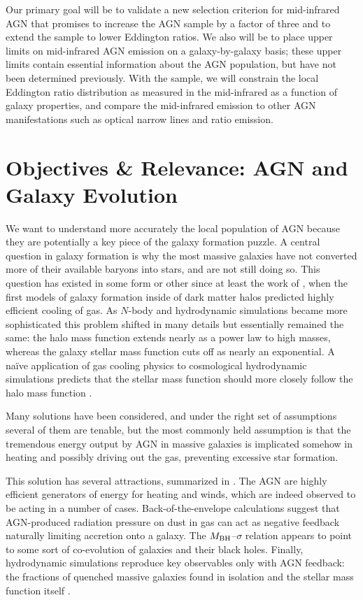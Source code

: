 \documentclass[12pt, preprint]{hacked-aastex}
\begin{document}
Our primary goal will be to validate a new selection criterion 
for mid-infrared AGN that promises to increase the AGN sample by 
a factor of three and to extend the sample to lower Eddington ratios.
We also will be to place upper limits on mid-infrared AGN emission
on a galaxy-by-galaxy basis; these upper limits contain
essential information about the AGN population, but have not 
been determined previously.
With the sample, we will constrain the local Eddington ratio 
distribution as measured in the mid-infrared as a function of 
galaxy properties, and compare the mid-infrared emission to other 
AGN manifestations such as optical narrow lines and ratio emission. 

\section{Objectives \& Relevance: AGN and Galaxy Evolution}\label{sec:intro}

We want to understand more accurately the local population of AGN because
they are potentially a key piece of the galaxy formation puzzle.
A central question in galaxy formation is why the most massive
galaxies have not converted more of their available baryons into stars,
and are not still doing so. This question has existed in some form or 
other since at least the work of \cite{white78a}, when the first models 
of galaxy formation
inside of dark matter halos predicted highly efficient cooling of
gas. As $N$-body and hydrodynamic simulations became more sophisticated 
this problem shifted in many details but essentially remained the same: 
the halo mass function extends nearly as a power law to high masses, whereas 
the galaxy stellar mass function cuts off as nearly an exponential. 
A na\"ive application of gas cooling physics to cosmological hydrodynamic
simulations predicts that the stellar mass function should more closely follow the halo mass function \cite{benson03a, somerville15a}.

Many solutions have been considered, and under the right set of assumptions
several of them are tenable, but the most commonly held assumption is that
the tremendous energy output by AGN in massive galaxies is implicated somehow
in heating and possibly driving out the gas, preventing excessive star formation.

This solution has several attractions, summarized in \cite{fabian12}. The AGN 
are highly efficient generators
of energy for heating and winds, which are indeed observed to be acting in a 
number of cases. Back-of-the-envelope calculations suggest that 
AGN-produced
radiation pressure on dust in gas can act as negative feedback naturally limiting
accretion onto a galaxy. The $M_{\rm BH}$--$\sigma$ relation appears to point
to some sort of co-evolution of galaxies and their black holes. Finally, 
hydrodynamic simulations reproduce key observables only with AGN feedback: 
the fractions of  quenched massive galaxies found in isolation and the stellar 
mass function  itself \cite{somerville15a, wellons22a}.
\end{document}
